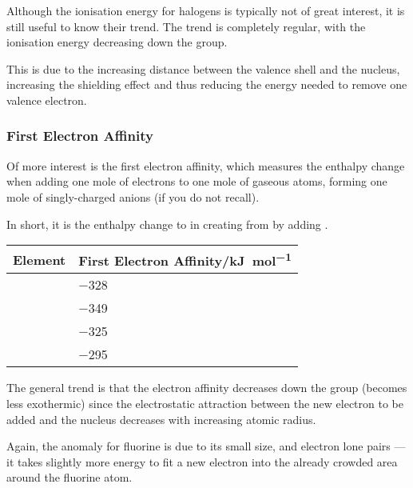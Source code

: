 				Although the ionisation energy for halogens is typically not of great interest, it is still useful to know their trend. The trend
				is completely regular, with the ionisation energy decreasing down the group.

				This is due to the increasing distance between the valence shell and the nucleus, increasing the shielding effect and thus
				reducing the energy needed to remove one valence electron.



			\subsubsection{First Electron Affinity}

				Of more interest is the first electron affinity, which measures the enthalpy change when adding one mole of electrons to one
				mole of gaseous atoms, forming one mole of singly-charged anions (if you do not recall).

				In short, it is the enthalpy change to in creating  from  by adding .

				\begin{center}\begin{table}[htb]\renewcommand{\arraystretch}{1.5}
				\begin{tabu} to \textwidth {X[c,m] | X[c,m]}

					Element		&	First Electron Affinity/\si{\kilo\joule\per\mole}	\\	\hline
							&	\num{-328}											\\	\hline
					\ch{\Cl}	&	\num{-349}											\\	\hline
							&	\num{-325}											\\	\hline
							&	\num{-295}											\\	\hline

				\end{tabu}
				\end{table}\end{center}\vspace{-10mm}


				The general trend is that the electron affinity decreases down the group (becomes less exothermic) since the electrostatic
				attraction between the new electron to be added and the nucleus decreases with increasing atomic radius.

				Again, the anomaly for fluorine is due to its small size, and electron lone pairs --- it takes slightly more energy to fit
				a new electron into the already crowded area around the fluorine atom.

